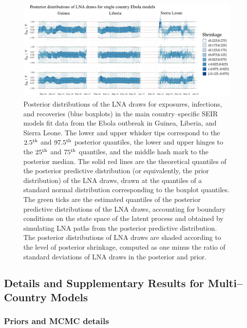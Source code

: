 \begin{figure}[htbp]
	\begin{fullpage}
		\centering
		\includegraphics[width=\linewidth]{figures/ebola_single_drawplots}
		\caption[Posterior distributions of LNA draws for the main country--specific SEIR models fit to data from the West Africa Ebola outbreak.]{Posterior distributions of the LNA draws for exposures, infections, and recoveries (blue boxplots) in the main country--specific SEIR models fit data from the Ebola outbreak in Guinea, Liberia, and Sierra Leone. The lower and upper whisker tips correspond to the $ 2.5^{\mathrm{th}} $ and $ 97.5^{\mathrm{th}} $ posterior quantiles, the lower and upper hinges to the $ 25^{\mathrm{th}} $ and $ 75^{\mathrm{th}} $ quantiles, and the middle hash mark to the posterior median. The solid red lines are the theoretical quantiles of the posterior predictive distribution (or equivalently, the prior distribution) of the LNA draws, drawn at the quantiles of a standard normal distribution corresponding to the boxplot quantiles. The green ticks are the estimated quantiles of the posterior predictive distributions of the LNA draws, accounting for boundary conditions on the state space of the latent process and obtained by simulating LNA paths from the posterior predictive distribution.  The posterior distributions of LNA draws are shaded according to the level of posterior shrinkage, computed as one minus the ratio of standard deviations of LNA draws in the posterior and prior.}
		\label{fig:ebola_single_drawplots}
	\end{fullpage}
\end{figure}

\newpage
\subsection{Details and Supplementary Results for Multi--Country Models}
\label{subsec:ebola_joint_supplement}

\subsubsection{Priors and MCMC details}
\label{subsubsec:ebola_joint_mcmc}

